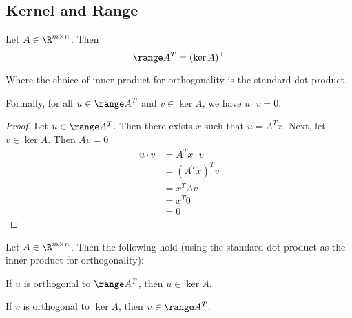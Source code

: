 \subsection{Kernel and Range}\label{f4d2050}

\label{a9e34ed}

Let $A\in\R^{m\times n}$. Then
$$
  \range A^T=(\ker A)^\perp
$$

Where the choice of inner product for orthogonality is the standard dot
product.

Formally, for all $u\in\range A^T$ and $v\in\ker A$, we have $u\cdot v=0$.

\begin{proof}
  Let $u\in\range A^T$. Then there exists $x$ such that $u=A^Tx$. Next, let
  $v\in\ker A$. Then $Av=0$
  \begin{align*}
    u\cdot v
     &=A^Tx\cdot v \\
     &=(A^Tx)^Tv   \\
     &=x^TAv       \\
     &=x^T0        \\
     &=0
  \end{align*}
\end{proof}

\label{b25bc43}

Let $A\in\R^{m\times n}$. Then the following hold (using the standard dot
product as the inner product for orthogonality):

\begin{enumerati}
  \item If $u$ is orthogonal to $\range A^T$, then $u\in\ker A$.
  \item If $v$ is orthogonal to $\ker A$, then $v\in\range A^T$.
\end{enumerati}

